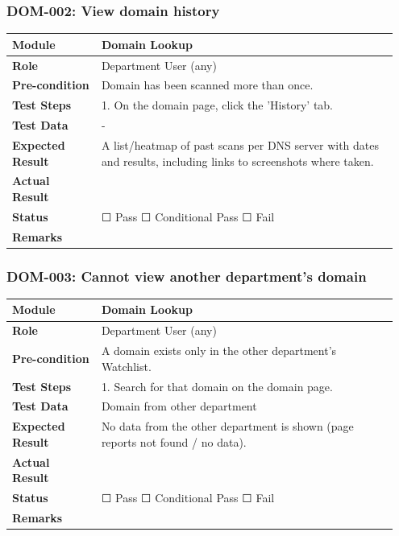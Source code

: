 \documentclass[10pt]{article}
\begin{document}
\subsubsection*{DOM-002: View domain history}
\begin{longtable}{p{0.22\linewidth}p{0.73\linewidth}}
\hline
\textbf{Module} & Domain Lookup \\ \hline
\textbf{Role} & Department User (any) \\ \hline
\textbf{Pre-condition} & Domain has been scanned more than once. \\ \hline
\textbf{Test Steps} & 1. On the domain page, click the 'History' tab. \\ \hline
\textbf{Test Data} & - \\ \hline
\textbf{Expected Result} & A list/heatmap of past scans per DNS server with dates and results, including links to screenshots where taken. \\ \hline
\textbf{Actual Result} & \newline \newline \\ \hline
\textbf{Status} & ☐ Pass \quad ☐ Conditional Pass \quad ☐ Fail \\ \hline
\textbf{Remarks} & \newline \\ \hline
\end{longtable}
\subsubsection*{DOM-003: Cannot view another department's domain}
\begin{longtable}{p{0.22\linewidth}p{0.73\linewidth}}
\hline
\textbf{Module} & Domain Lookup \\ \hline
\textbf{Role} & Department User (any) \\ \hline
\textbf{Pre-condition} & A domain exists only in the other department's Watchlist. \\ \hline
\textbf{Test Steps} & 1. Search for that domain on the domain page. \\ \hline
\textbf{Test Data} & Domain from other department \\ \hline
\textbf{Expected Result} & No data from the other department is shown (page reports not found / no data). \\ \hline
\textbf{Actual Result} & \newline \newline \\ \hline
\textbf{Status} & ☐ Pass \quad ☐ Conditional Pass \quad ☐ Fail \\ \hline
\textbf{Remarks} & \newline \\ \hline
\end{longtable}
\end{document}
